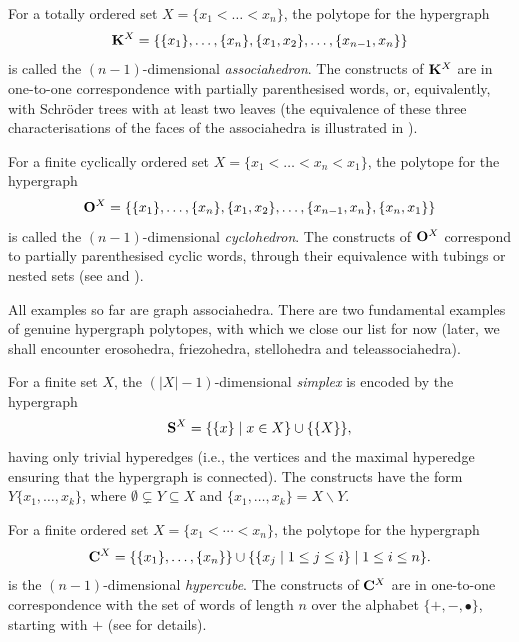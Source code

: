 \documentclass{article}
\theoremstyle{plain}
\newcommand{\incs}{\subsetneq}
\theoremstyle{definition}
\newcommand{\inc}{\subseteq}
\newcommand{\union}{\cup}
\newcommand{\set}[1]{\{#1\}}
\newcommand{\setc}[2]{\set{#1 \mid #2}}
\newcommand{\hyper}[1]{{\bf #1}}
\begin{document}
\smallskip
For a totally ordered set $X=\{x_1<\dots < x_n\}$, the polytope for the hypergraph 
$${\bf K}^{X}=\{\{x_1\},\dots,\{x_n\},\{x_1,x_2\},\dots,\{x_{n-1},x_n\}\}$$
is called the $(n-1)$-dimensional \emph{associahedron}. The constructs of ${\bf K}^{X}$ are in one-to-one correspondence with  partially parenthesised words, or, equivalently, with  Schr\" oder trees with at least two leaves  (the equivalence of these three characterisations of the faces of the associahedra is illustrated in \cite[Section 2.4]{COI}).

\smallskip

For a finite cyclically ordered set $X=\set{x_1<\ldots<x_n<x_1}$,  the polytope for the hypergraph
$${\bf O}^X=\set{\set{x_1},\ldots,\set{x_n},\set{x_1,x_2},\ldots,\set{x_{n-1},x_n},\set{x_n,x_1}}$$ is called the $(n-1)$-dimensional \emph{cyclohedron}.
The constructs of ${\bf O}^X$ correspond to   partially parenthesised cyclic words, through their equivalence with tubings or nested sets (see \cite[Proposition 2]{COI} and \cite[Lemma 1.4]{Markl-Cyc}).
 
\smallskip 
All examples so far are graph associahedra. There are two fundamental examples of genuine hypergraph polytopes, with which we close our list for now (later, we shall encounter erosohedra, friezohedra, stellohedra and teleassociahedra).

\smallskip

For  a finite set $X$, the $(|X|-1)$-dimensional   \emph{simplex} is encoded by the hypergraph   $$\hyper{S}^X=\setc{\set{x}}{x\in X}\union\set{\set{X}},$$ having only trivial hyperedges (i.e., the vertices and the maximal hyperedge ensuring that the hypergraph is connected). The constructs have the form $Y\{x_1,\dots,x_k\}$, where $\emptyset\incs Y\inc X$ and $\{x_1, \ldots, x_k\}=X\backslash Y$.

\smallskip
For a finite ordered set $X=\set{x_1<\cdots<x_n}$, the polytope for the hypergraph 
 $$\hyper{C}^X=\{\{x_1\},\dots,\{x_n\}\}\cup\setc{\setc{x_j}{1\leq j\leq i}}{1\leq i\leq n}.$$
is the $(n-1)$-dimensional \emph{hypercube}. The constructs of $\hyper{C}^X$ are in one-to-one correspondence with the set of words of
length $n$ over the alphabet $\{+,-,\bullet\}$, starting with $+$ (see \cite[Example 3.7]{PLBJ1} for details). 

 
\end{document}
